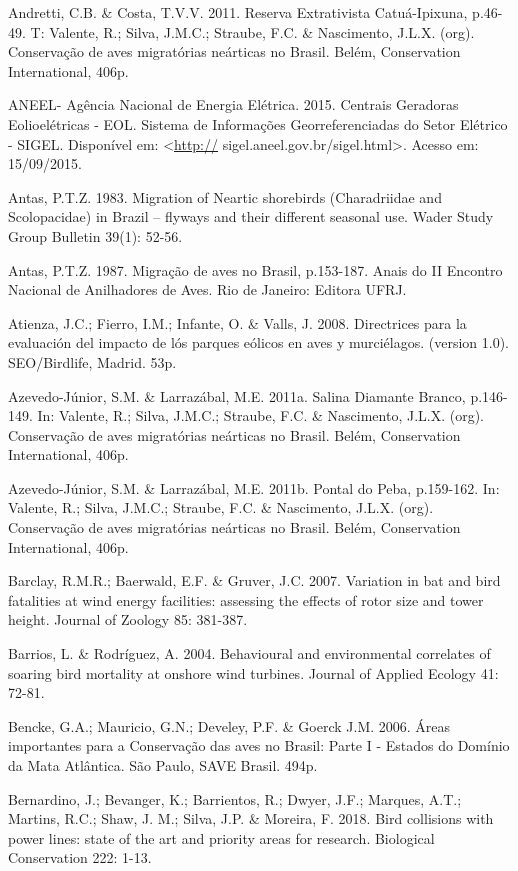 \documentclass[
]{scrbook}
\begin{document}
Andretti, C.B. \& Costa, T.V.V. 2011. Reserva Extrativista Catuá-Ipixuna, p.46-49. T: Valente, R.; Silva, J.M.C.; Straube, F.C. \& Nascimento, J.L.X. (org). Conservação de aves migratórias neárticas no Brasil. Belém, Conservation International, 406p.

ANEEL- Agência Nacional de Energia Elétrica. 2015. Centrais Geradoras Eolioelétricas - EOL. Sistema de Informações Georreferenciadas do Setor Elétrico - SIGEL. Disponível em: \textless{}\url{http://} sigel.aneel.gov.br/sigel.html\textgreater. Acesso em: 15/09/2015.

Antas, P.T.Z. 1983. Migration of Neartic shorebirds (Charadriidae and Scolopacidae) in Brazil -- flyways and their different seasonal use. Wader Study Group Bulletin 39(1): 52-56.

Antas, P.T.Z. 1987. Migração de aves no Brasil, p.153-187. Anais do II Encontro Nacional de Anilhadores de Aves. Rio de Janeiro: Editora UFRJ.

Atienza, J.C.; Fierro, I.M.; Infante, O. \& Valls, J. 2008. Directrices para la evaluación del impacto de lós parques eólicos en aves y murciélagos. (version 1.0). SEO/Birdlife, Madrid. 53p.

Azevedo-Júnior, S.M. \& Larrazábal, M.E. 2011a. Salina Diamante Branco, p.146-149. In: Valente, R.; Silva, J.M.C.; Straube, F.C. \& Nascimento, J.L.X. (org). Conservação de aves migratórias neárticas no Brasil. Belém, Conservation International, 406p.

Azevedo-Júnior, S.M. \& Larrazábal, M.E. 2011b. Pontal do Peba, p.159-162. In: Valente, R.; Silva, J.M.C.; Straube, F.C. \& Nascimento, J.L.X. (org). Conservação de aves migratórias neárticas no Brasil. Belém, Conservation International, 406p.

Barclay, R.M.R.; Baerwald, E.F. \& Gruver, J.C. 2007. Variation in bat and bird fatalities at wind energy facilities: assessing the effects of rotor size and tower height. Journal of Zoology 85: 381-387.

Barrios, L. \& Rodríguez, A. 2004. Behavioural and environmental correlates of soaring bird mortality at onshore wind turbines. Journal of Applied Ecology 41: 72-81.

Bencke, G.A.; Mauricio, G.N.; Develey, P.F. \& Goerck J.M. 2006. Áreas importantes para a Conservação das aves no Brasil: Parte I - Estados do Domínio da Mata Atlântica. São Paulo, SAVE Brasil. 494p.

Bernardino, J.; Bevanger, K.; Barrientos, R.; Dwyer, J.F.; Marques, A.T.; Martins, R.C.; Shaw, J. M.; Silva, J.P. \& Moreira, F. 2018. Bird collisions with power lines: state of the art and priority areas for research. Biological Conservation 222: 1-13.
\end{document}
